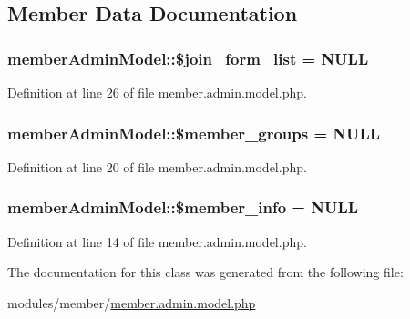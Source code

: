 \subsection{Member Data Documentation}
\subsubsection[{\texorpdfstring{\$join\+\_\+form\+\_\+list}{$join_form_list}}]{\setlength{\rightskip}{0pt plus 5cm}member\+Admin\+Model\+::\$join\+\_\+form\+\_\+list = N\+U\+LL}\hypertarget{classmemberAdminModel_a24bd367796a7bc111c649ce71502f30d}{}\label{classmemberAdminModel_a24bd367796a7bc111c649ce71502f30d}


Definition at line 26 of file member.\+admin.\+model.\+php.

\subsubsection[{\texorpdfstring{\$member\+\_\+groups}{$member_groups}}]{\setlength{\rightskip}{0pt plus 5cm}member\+Admin\+Model\+::\$member\+\_\+groups = N\+U\+LL}\hypertarget{classmemberAdminModel_a4147285c4d6a90b6d73c2d4f2b974b3b}{}\label{classmemberAdminModel_a4147285c4d6a90b6d73c2d4f2b974b3b}


Definition at line 20 of file member.\+admin.\+model.\+php.

\subsubsection[{\texorpdfstring{\$member\+\_\+info}{$member_info}}]{\setlength{\rightskip}{0pt plus 5cm}member\+Admin\+Model\+::\$member\+\_\+info = N\+U\+LL}\hypertarget{classmemberAdminModel_a4d4a6cc79e642c4dfabcf5f6666991b2}{}\label{classmemberAdminModel_a4d4a6cc79e642c4dfabcf5f6666991b2}


Definition at line 14 of file member.\+admin.\+model.\+php.



The documentation for this class was generated from the following file\+:\begin{DoxyCompactItemize}
\item 
modules/member/\hyperlink{member_8admin_8model_8php}{member.\+admin.\+model.\+php}\end{DoxyCompactItemize}
